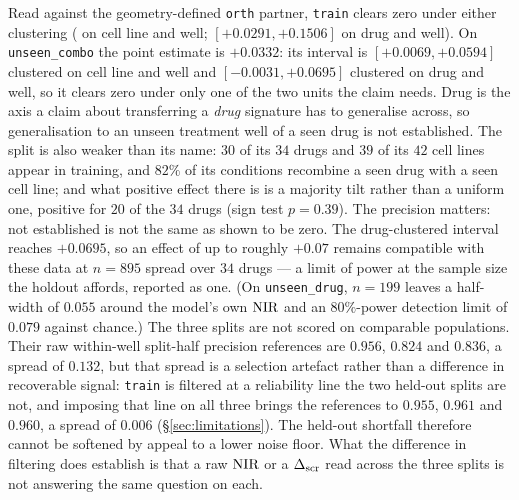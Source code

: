Read against the geometry-defined \texttt{orth} partner, \texttt{train} clears zero under either clustering
( on cell line and well; $[+0.0291, +0.1506]$ on drug and well).
On \texttt{unseen\_combo} the point estimate is $+0.0332$: its interval is
$[+0.0069, +0.0594]$ clustered on cell line and well and $[-0.0031, +0.0695]$ clustered on drug and
well, so it clears zero under only one of the two units the claim needs. Drug is the axis a claim about
transferring a \emph{drug} signature has to generalise across, so generalisation to an unseen
treatment well of a seen drug is not established. The split is also weaker than its name: $30$ of
its $34$ drugs and $39$ of its $42$ cell lines appear in training, and $82\%$ of its conditions
recombine a seen drug with a seen cell line; and what positive effect there is is a majority tilt
rather than a uniform one, positive for $20$ of the $34$ drugs (sign test $p = 0.39$). The precision matters: not established
is not the same as shown to be zero. The drug-clustered interval reaches $+0.0695$, so an effect of
up to roughly $+0.07$ remains compatible with these data at $n = 895$ spread over $34$ drugs --- a
limit of power at the sample size the holdout affords, reported as one. (On \texttt{unseen\_drug},
$n = 199$ leaves a half-width of $0.055$ around the model's own $\textrm{NIR}$ and an $80\%$-power detection
limit of $0.079$ against chance.) The three splits are not scored on comparable populations. Their
raw within-well split-half precision references are $0.956$, $0.824$ and $0.836$, a spread of
$0.132$, but that spread is a selection artefact rather than a difference in recoverable signal:
\texttt{train} is filtered at a reliability line the two held-out splits are not, and imposing that
line on all three brings the references to $0.955$, $0.961$ and $0.960$, a spread of $0.006$
(\S\ref{sec:limitations}). The held-out shortfall therefore cannot be softened by appeal to a lower
noise floor. What the difference in filtering does establish is that a raw $\textrm{NIR}$ or a $\Delta_{\textrm{scr}}$ read
across the three splits is not answering the same question on each.

